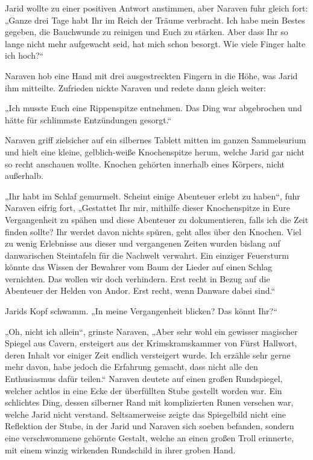 Jarid wollte zu einer positiven Antwort anstimmen, aber Naraven fuhr gleich fort: „Ganze drei Tage habt Ihr im Reich der Träume verbracht. Ich habe mein Bestes gegeben, die Bauchwunde zu reinigen und Euch zu stärken. Aber dass Ihr so lange nicht mehr aufgewacht seid, hat mich schon besorgt. Wie viele Finger halte ich hoch?“

Naraven hob eine Hand mit drei ausgestreckten Fingern in die Höhe, was Jarid ihm mitteilte. Zufrieden nickte Naraven und redete dann gleich weiter:

„Ich musste Euch eine Rippenspitze entnehmen. Das Ding war abgebrochen und hätte für schlimmste Entzündungen gesorgt.“

Naraven griff zielsicher auf ein silbernes Tablett mitten im ganzen Sammelsurium und hielt eine kleine, gelblich-weiße Knochenspitze herum, welche Jarid gar nicht so recht anschauen wollte. Knochen gehörten innerhalb eines Körpers, nicht außerhalb.

„Ihr habt im Schlaf gemurmelt. Scheint einige Abenteuer erlebt zu haben“, fuhr Naraven eifrig fort, „Gestattet Ihr mir, mithilfe dieser Knochenspitze in Eure Vergangenheit zu spähen und diese Abenteuer zu dokumentieren, falls ich die Zeit finden sollte? Ihr werdet davon nichts spüren, geht alles über den Knochen. Viel zu wenig Erlebnisse aus dieser und vergangenen Zeiten wurden bislang auf danwarischen Steintafeln für die Nachwelt verwahrt. Ein einziger Feuersturm könnte das Wissen der Bewahrer vom Baum der Lieder auf einen Schlag vernichten. Das wollen wir doch verhindern. Erst recht in Bezug auf die Abenteuer der Helden von Andor. Erst recht, wenn Danware dabei sind.“

Jarids Kopf schwamm. „In meine Vergangenheit blicken? Das könnt Ihr?“

„Oh, nicht ich allein“, grinste Naraven, „Aber sehr wohl ein gewisser magischer Spiegel aus Cavern, ersteigert aus der Krimskramskammer von Fürst Hallwort, deren Inhalt vor einiger Zeit endlich versteigert wurde. Ich erzähle sehr gerne mehr davon, habe jedoch die Erfahrung gemacht, dass nicht alle den Enthusiasmus dafür teilen.“ Naraven deutete auf einen großen Rundspiegel, welcher achtlos in eine Ecke der überfüllten Stube gestellt worden war. Ein schlichtes Ding, dessen silberner Rand mit komplizierten Runen versehen war, welche Jarid nicht verstand. Seltsamerweise zeigte das Spiegelbild nicht eine Reflektion der Stube, in der Jarid und Naraven sich soeben befanden, sondern eine verschwommene gehörnte Gestalt, welche an einen großen Troll erinnerte, mit einem winzig wirkenden Rundschild in ihrer groben Hand.

